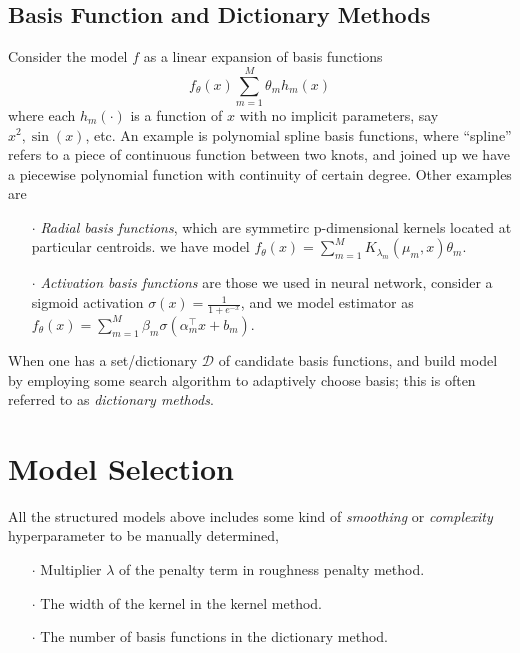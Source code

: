 \documentclass[a4paper, 11pt]{article}
\begin{document}
\subsection{Basis Function and Dictionary Methods}
Consider the model $f$ as a linear expansion of basis functions
$$
f_{\theta}(x) \sum_{m=1}^M \theta_m h_m(x)
$$
where each $h_m(\cdot)$ is a function of $x$ with no implicit parameters, say $x^2, \sin(x)$, etc. An example is polynomial spline basis functions, where ``spline'' refers to a piece of continuous function between two knots, and joined up we have a piecewise polynomial function with continuity of certain degree. Other examples are
\begin{itemize}
	\item[$\cdot$] \emph{Radial basis functions}, which are symmetirc p-dimensional kernels located at particular centroids. we have model $f_{\theta}(x)=\sum_{m=1}^M K_{\lambda_m}(\mu_m, x) \theta_m$.
	\item[$\cdot$] \emph{Activation basis functions} are those we used in neural network, consider a sigmoid activation $\sigma(x)=\frac{1}{1+e^{-x}}$, and we model estimator as $f_{\theta}(x)=\sum_{m=1}^M \beta_m \sigma(\alpha^{\top}_m x+b_m)$.
\end{itemize}
When one has a set/dictionary $\mathcal{D}$ of candidate basis functions, and build model by employing some search algorithm to adaptively choose basis; this is often referred to as \emph{dictionary methods}.




\section{Model Selection}
All the structured models above includes some kind of \emph{smoothing} or \emph{complexity} hyperparameter to be manually determined,
\begin{itemize}
	\item[$\cdot$] Multiplier $\lambda$ of the penalty term in roughness penalty method.
	\item[$\cdot$] The width of the kernel in the kernel method.
	\item[$\cdot$] The number of basis functions in the dictionary method.
\end{itemize}
\end{document}
